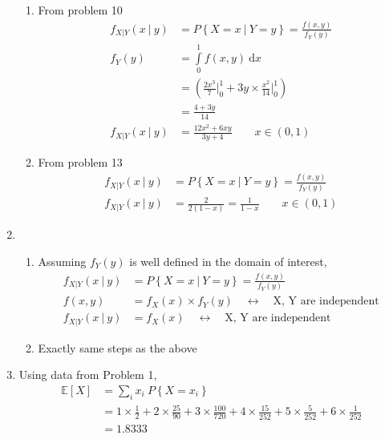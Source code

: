 \begin{enumerate}
		\begin{enumerate}
			\item From problem 10 \\
			\begin{align}
				f_{X|Y}(x\ |\ y) &= P \left\{ X = x\ |\ Y = y \right\} = \frac{f(x, y)}{f_Y(y)}\nonumber\\
				f_Y (y) &= \int\limits_{0}^{1} f(x, y)\ \mathrm{d}x \nonumber \\
				&= \left( \frac{2x^3}{7} \Big|_0^1 + 3y \times \frac{x^2}{14}\Big|_0^1  \right) \nonumber \\
				&= \frac{4 + 3y}{14} \\
				f_{X|Y}(x\ |\ y) &= \frac{12x^2 + 6xy}{3y + 4} \qquad x \in \left(0, 1\right)
			\end{align}
			
			\item From problem 13 \\
			\begin{align}
				f_{X|Y}(x\ |\ y) &= P \left\{ X = x\ |\ Y = y \right\} = \frac{f(x, y)}{f_Y(y)}\nonumber\\
				f_{X|Y}(x\ |\ y) &= \frac{2}{2(1-x)} = \frac{1}{1-x} \qquad x \in \left(0, 1\right)
			\end{align}
		\end{enumerate}
	
	
	\item 
	
		\begin{enumerate}
			\item Assuming $ f_Y (y) $ is well defined in the domain of interest,
			\begin{align}
				f_{X|Y}(x\ |\ y) &= P \left\{ X = x\ |\ Y = y \right\} = \frac{f(x, y)}{f_Y(y)} \nonumber\\
				f(x,y) &= f_X (x) \times f_Y (y) \quad \leftrightarrow \quad \text{X, Y are independent}  \nonumber\\
				f_{X|Y}(x\ |\ y) &= f_X (x) \quad \leftrightarrow \quad \text{X, Y are independent}
			\end{align}
			
			\item Exactly same steps as the above
		\end{enumerate}
	
	
	\item Using data from Problem 1,
	\begin{align}
		\mathbb{E}[X] &= \sum\limits_{i} x_i\ P \left\{ X = x_i \right\} \nonumber \\
		&= 1 \times \frac{1}{2} + 2 \times \frac{25}{90} + 3 \times \frac{100}{720} + 4 \times \frac{15}{252} + 5 \times \frac{5}{252} + 6 \times \frac{1}{252} \nonumber \\
		&= 1.8333
	\end{align}
	

\end{enumerate}
